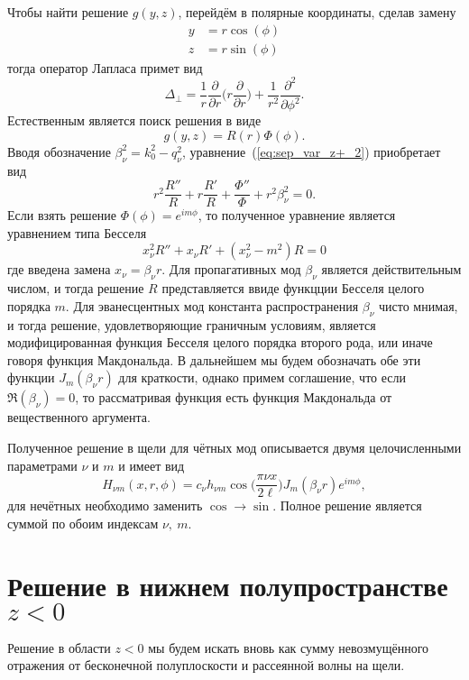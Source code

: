 Чтобы найти решение $g(y,z)$, перейдём в полярные координаты, сделав
замену 
\begin{align*}
    y &= r \cos(\phi) \\
    z &= r \sin(\phi)
\end{align*}
тогда оператор Лапласа примет вид
$$
\Delta_\perp  = \frac{1}{r}\frac{\partial }{\partial r}\Big(r \frac{\partial }{\partial r} \Big) + \frac{1}{r^2}\frac{\partial^2 }{\partial \phi^2}.
$$
Естественным является поиск решения в виде 
$$
g(y,z) = R(r)\Phi(\phi).
$$
Вводя обозначение $\beta_\nu^2 = k_0^2 - q_\nu^2$, уравнение~(\ref{eq:sep_var_z+_2}) приобретает вид
\begin{equation}
    r^2 \frac{R''}{R} + r \frac{R'}{R} + \frac{\Phi''}{\Phi} + r^2\beta_\nu^2 = 0.
\end{equation}
Если взять решение $\Phi(\phi) = e^{i m \phi}$, то полученное уравнение
является уравнением типа Бесселя
\begin{equation}
    x_\nu^2 R'' + x_\nu R' + (x_\nu^2-m^2)R = 0
\end{equation}
где введена замена $x_\nu = \beta_\nu r$. Для пропагативных мод $\beta_\nu$ является действительным числом, и тогда решение $R$ представляется ввиде функцции Бесселя целого порядка $m$. Для 
эванесцентных мод константа распространения $\beta_\nu$ чисто мнимая, и тогда решение, удовлетворяющие граничным условиям, является модифицированная функция Бесселя целого порядка второго рода, или иначе говоря функция Макдональда. В дальнейшем мы будем обозначать обе эти функции $J_m(\beta_\nu r)$ для краткости, однако примем соглашение, что если $\Re(\beta_\nu) = 0$, то рассматривая функция есть функция Макдональда от вещественного аргумента.

Полученное решение в щели для чётных мод описывается двумя целочисленными параметрами $\nu$ и $m$ и имеет вид
\begin{equation}
    H_{\nu m}(x,r,\phi) = c_\nu h_{\nu m}\cos\Big(\frac{\pi \nu x}{2 \ell}\Big) J_m(\beta_\nu r) e^{i m \phi},
\end{equation}
для нечётных необходимо заменить $\cos \to \sin$. Полное решение является суммой по обоим индексам $\nu,\ m$.
\section{Решение в нижнем полупространстве $z<0$}
Решение в области $z<0$ мы будем искать вновь как сумму невозмущённого
отражения от бесконечной полуплоскости и рассеянной волны на щели. 

